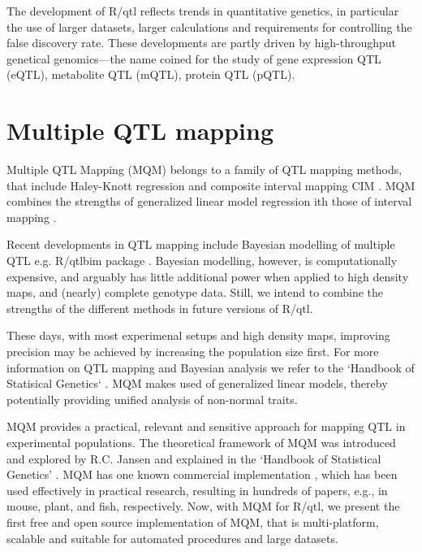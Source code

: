 \documentclass[8pt, twoside, a5paper]{report}
\begin{document}
The development of R/qtl reflects trends in quantitative genetics, in particular the use of larger datasets, larger 
calculations and requirements for controlling the false discovery rate. These developments are partly driven by 
high-throughput genetical genomics---the name coined for the study of gene expression QTL (eQTL)\cite{Jansen:2001a}, 
metabolite QTL (mQTL), protein QTL (pQTL).

\section{Multiple QTL mapping}

Multiple QTL Mapping (MQM) belongs to a family of QTL mapping methods, that include Haley-Knott regression
\cite{Haley:1992} and composite interval mapping CIM \cite{Zeng:1994}. MQM combines the strengths of generalized 
linear model regression ith those of interval mapping \cite{Jansen:1993, Jansen:1994b}. 

Recent developments in QTL mapping include Bayesian modelling of multiple QTL e.g. R/qtlbim package
\cite{Yandell:2007, Banerjee:2008}. Bayesian modelling, however, is computationally expensive, and arguably has 
little additional power when applied to high density maps, and (nearly) complete genotype data\cite{Handbook:Jansen:2007}. 
Still, we intend to combine the strengths of the different methods in future versions of R/qtl.

These days, with most experimenal setups and high density maps, improving precision may be achieved by increasing 
the population size first. For more information on QTL mapping and Bayesian analysis we refer to the `Handbook of 
Statisical Genetics` \cite{Handbook:2007}. MQM makes used of generalized linear models, thereby potentially 
providing unified analysis of non-normal traits.

MQM provides a practical, relevant and sensitive approach for mapping QTL in experimental populations. The 
theoretical framework of MQM was introduced and explored by R.C. Jansen\cite{Jansen:1994a} and explained in the 
`Handbook of Statistical Genetics' \cite{Handbook:Jansen:2007}. MQM has one known commercial implementation
\cite{Mapqtl:2002}, which has been used effectively in practical research, resulting in hundreds of papers, e.g., 
in mouse, plant, and fish, respectively\cite{DeMooij:2009, Jeuken:2009, Kitano:2009}.  Now, with MQM for R/qtl, 
we present the first free and open source implementation of MQM, that is multi-platform, scalable and suitable 
for automated procedures and large datasets.
\end{document}
